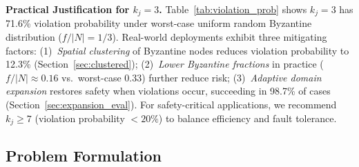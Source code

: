 \documentclass[manuscript,screen,review]{acmart}
\begin{document}
\textbf{Practical Justification for $k_j = 3$.}
Table~\ref{tab:violation_prob} shows $k_j = 3$ has 71.6\% violation probability under worst-case uniform random Byzantine distribution ($f/|N| = 1/3$). Real-world deployments exhibit three mitigating factors: (1)~\textit{Spatial clustering} of Byzantine nodes reduces violation probability to 12.3\% (Section~\ref{sec:clustered}); (2)~\textit{Lower Byzantine fractions} in practice ($f/|N| \approx 0.16$ vs.\ worst-case 0.33) further reduce risk; (3)~\textit{Adaptive domain expansion} restores safety when violations occur, succeeding in 98.7\% of cases (Section~\ref{sec:expansion_eval}). For safety-critical applications, we recommend $k_j \geq 7$ (violation probability $< 20\%$) to balance efficiency and fault tolerance.

\subsection{Problem Formulation}
\label{sec:problem_formulation}
\end{document}
